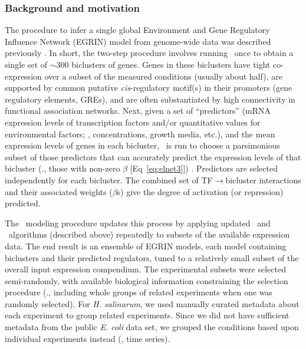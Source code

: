 \subsubsection{Background and motivation}

The procedure to infer a single global Environment and Gene Regulatory
Influence Network (EGRIN) model from genome-wide data was described
previously \cite{Bonneau2007,Bonneau2006,Reiss2006n}. In short, the
two-step procedure involves running \cm~once to obtain a single set of $\sim 300$
biclusters of genes. Genes in these biclusters have tight co-expression 
over a subset of the measured conditions (usually
about half), are supported by common putative
\textit{cis}-regulatory motif(s) in their promoters (gene regulatory elements, GREs), 
and are often substantiated by high connectivity in functional association networks. 
Next, given a set of ``predictors'' (mRNA expression levels of transcription factors
and/or quantitative values for environmental factors; \eg,
concentrations, growth media, etc.), and the mean expression levels of genes in each bicluster, \nwinf~is run to choose a
parsimonious subset of those predictors that can accurately predict the
expression levels of that bicluster (\ie., those with non-zero
$\beta$ [Eq~\ref{eq:elnet3}]) . Predictors are selected
independently for each bicluster. The combined set of
TF$\rightarrow$bicluster interactions and their associated weights
($\beta$s) give the degree of activation (or repression) predicted.

The \egrine~modeling procedure updates this process by applying 
updated \cm\ and \nwinf\ algorithms (described above)
repeatedly to subsets of the available expression data. The end result
is an ensemble of EGRIN models, each model containing biclusters and
their predicted regulators, tuned to a relatively small subset of the
overall input expression compendium. The experimental subsets were
selected semi-randomly, with available biological information
constraining the selection procedure (\ie., including whole groups of
related experiments when one was randomly selected). For {\it
H. salinarum}, we used manually curated metadata about each experiment
to group related experiments. Since we did not have sufficient metadata 
from the public \textit{E. coli} data set,
 we grouped the conditions based upon individual experiments instead (\eg,
time series). 

